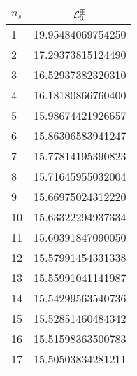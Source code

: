 \begin{tabular}[t]{lc}
\toprule
  $n_{s}$ &  $\mathcal L^{\boxplus}_3$ \\ \toprule
\midrule
        1 &                   19.95484069754250 \\
        2 &                   17.29373815124490 \\
        3 &                   16.52937382320310 \\
        4 &                   16.18180866760400 \\
        5 &                   15.98674421926657 \\
        6 &                   15.86306583941247 \\
        7 &                   15.77814195390823 \\
        8 &                   15.71645955032004 \\
        9 &                   15.66975024312220 \\
       10 &                   15.63322294937334 \\
       11 &                   15.60391847090050 \\
       12 &                   15.57991454331338 \\
       13 &                   15.55991041141987 \\
       14 &                   15.54299563540736 \\
       15 &                   15.52851460484342 \\
       16 &                   15.51598363500783 \\
       17 &                   15.50503834281211 \\
\bottomrule
\end{tabular}
\hspace{2em}
